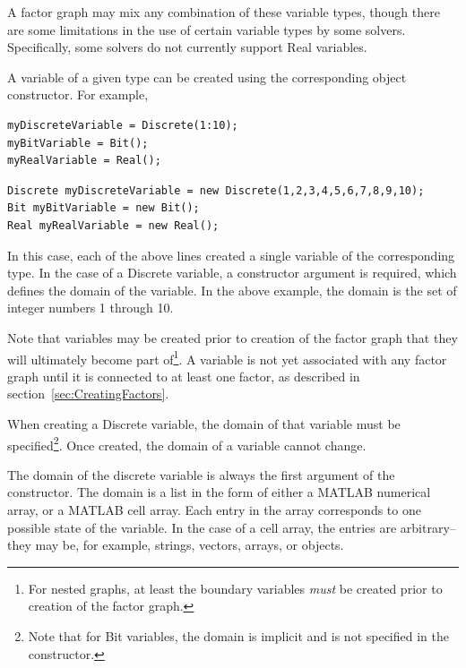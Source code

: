 A factor graph may mix any combination of these variable types, though there are some limitations in the use of certain variable types by some solvers.  Specifically, some solvers do not currently support Real variables.

A variable of a given type can be created using the corresponding object constructor.  For example,

\ifmatlab

\begin{lstlisting}
myDiscreteVariable = Discrete(1:10);
myBitVariable = Bit();
myRealVariable = Real();
\end{lstlisting}

\fi

\ifjava
\begin{lstlisting}
Discrete myDiscreteVariable = new Discrete(1,2,3,4,5,6,7,8,9,10);
Bit myBitVariable = new Bit();
Real myRealVariable = new Real();
\end{lstlisting}
\fi

In this case, each of the above lines created a single variable of the corresponding type.  In the case of a Discrete variable, a constructor argument is required, which defines the domain of the variable.  In the above example, the domain is the set of integer numbers 1 through 10.

Note that variables may be created prior to creation of the factor graph that they will ultimately become part of\footnote{For nested graphs, at least the boundary variables \emph{must} be created prior to creation of the factor graph.}.  A variable is not yet associated with any factor graph until it is connected to at least one factor, as described in section~\ref{sec:CreatingFactors}.




When creating a Discrete variable, the domain of that variable must be specified\footnote{Note that for Bit variables, the domain is implicit and is not specified in the constructor.}.  Once created, the domain of a variable cannot change.  

\ifmatlab

The domain of the discrete variable is always the first argument of the constructor.  The domain is a list in the form of either a MATLAB numerical array, or a MATLAB cell array.  Each entry in the array corresponds to one possible state of the variable.  In the case of a cell array, the entries are arbitrary--they may be, for example, strings, vectors, arrays, or objects.

